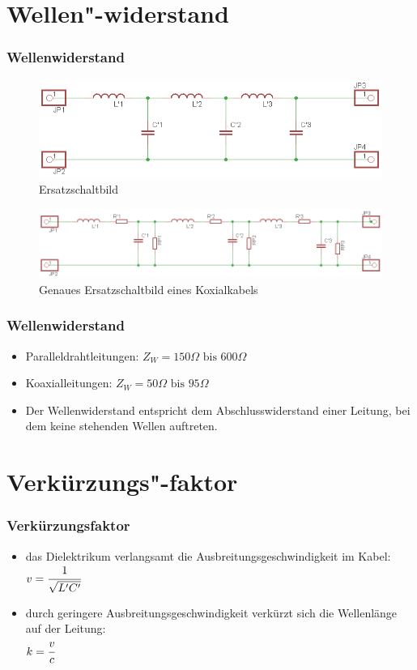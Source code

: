 \section*{Wellen"-widerstand}
\begin{frame}
  \frametitle{Wellenwiderstand}
  \begin{figure}
    \includegraphics[width=\textwidth,height=.30\textheight,keepaspectratio]{a10/wellenesb.png}
    \caption{Ersatzschaltbild}
  \end{figure}
  \begin{figure}
    \includegraphics[width=\textwidth,height=.30\textheight,keepaspectratio]{a10/wellenesbex.png}
    \caption{Genaues Ersatzschaltbild eines Koxialkabels}
  \end{figure}
\end{frame}

\begin{frame}
  \frametitle{Wellenwiderstand}
  \begin{itemize}
      \begin{block}{Wellenwiderstand}
        $Z_W = \sqrt{\cfrac{L'}{C'}}$
      \end{block}
    \item Paralleldrahtleitungen: $Z_W = 150 \Omega \text{ bis } 600 \Omega$
    \item Koaxialleitungen: $Z_W = 50 \Omega \text{ bis } 95 \Omega$
    \item Der Wellenwiderstand entspricht dem Abschlusswiderstand einer Leitung, bei dem keine stehenden Wellen auftreten.
  \end{itemize}
\end{frame}

\section*{Verkürzungs"-faktor}
\begin{frame}
  \frametitle{Verkürzungsfaktor}
  \begin{itemize}
    \item das Dielektrikum verlangsamt die Ausbreitungsgeschwindigkeit im Kabel: \\
      $v = \cfrac{1}{\sqrt{L' C'}}$
    \item durch geringere Ausbreitungsgeschwindigkeit verkürzt sich die
      Wellenlänge auf der Leitung: \\ $k = \cfrac{v}{c}$
  \end{itemize}
\end{frame}

